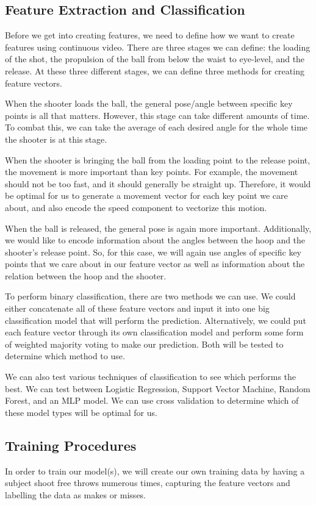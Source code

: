 \documentclass[10pt,twocolumn,letterpaper]{article}
\begin{document}
\subsection{Feature Extraction and Classification}
Before we get into creating features, we need to define how we want to create features using continuous video. There are three stages we can define: the loading of the shot, the propulsion of the ball from below the waist
to eye-level, and the release. At these three different stages, we can define three methods for creating feature vectors.

When the shooter loads the ball, the general pose/angle between specific key points is all that matters. However, this stage can take different amounts of time. To combat this,
we can take the average of each desired angle for the whole time the shooter is at this stage.

When the shooter is bringing the ball from the loading point to the release point, the movement is more important than key points. For example, the movement should not be too fast, and it should generally be straight up.
Therefore, it would be optimal for us to generate a movement vector for each key point we care about, and also encode the speed component to vectorize this motion.

When the ball is released, the general pose is again more important. Additionally, we would like to encode information about the angles between the hoop and the shooter's release point. So, for this case, we
will again use angles of specific key points that we care about in our feature vector as well as information about the relation between the hoop and the shooter.

To perform binary classification, there are two methods we can use. We could either concatenate all of these feature vectors and input it into one big classification model that will perform the prediction. Alternatively, 
we could put each feature vector through its own classification model and perform some form of weighted majority voting to make our prediction. Both will be tested to determine which method to use.

We can also test various techniques of classification to see which performs the best. We can test between Logistic Regression, Support Vector Machine, Random Forest, and an MLP model. We can use cross validation to determine which
of these model types will be optimal for us.

\subsection{Training Procedures}
In order to train our model(s), we will create our own training data by having a subject shoot free throws numerous times, capturing the feature vectors and labelling the data as makes or misses.
\end{document}
